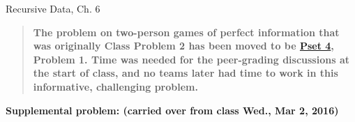 \documentclass[handout]{mcs}
\begin{document}

\begin{staffnotes}
Recursive Data, Ch. 6
\end{staffnotes}



\begin{quote}
\textbf{ The problem on two-person games of perfect information that
  was originally Class Problem 2 has been moved to be
  \href{https://courses.csail.mit.edu/6.042/spring16/ps4.pdf}{Pset 4},
  Problem 1.  Time was needed for the peer-grading discussions at the
  start of class, and no teams later had time to work in this
  informative, challenging problem.}
\end{quote}



\begin{center}
\textbf{Supplemental problem: (carried over from class Wed., Mar 2, 2016)}
\end{center}




\end{document}
